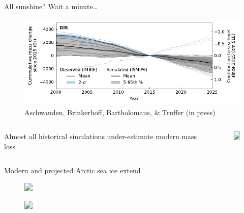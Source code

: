 \documentclass[hide notes,intlimits]{beamer}
\begin{document}
\begin{frame}{All sunshine? Wait a minute\ldots}
  \begin{figure}
    \includegraphics[width=\textwidth]{GIS_hist_with_obs}
    \caption{Aschwanden, Brinkerhoff, Bartholomaus, \& Truffer (in press)}
  \end{figure}
  \begin{columns}[c]
    \begin{column}{.5\textwidth}
      \begin{minipage}[t][.5\textheight][t]{\textwidth}
        \alert{Almost all historical simulations under-estimate modern mass loss}
      \end{minipage}
    \end{column}
    \begin{column}{.25\textwidth}
      \begin{minipage}[t][.5\textheight][t]{\textwidth}
        \begin{figure}
          \includegraphics<2>[width=1.8cm]{brain_thinking}
        \end{figure}
      \end{minipage}
    \end{column}
  \end{columns}
\end{frame}


\begin{frame}{Modern and projected Arctic sea ice extend}
  \begin{minipage}[t][1.25cm][t]{\textwidth}
    \begin{figure}
      \includegraphics<1->[width=1cm]{brain_solution}
    \end{figure}
  \end{minipage}
  \vspace{0.25em}
  \begin{minipage}[t][6.25cm][b]{\textwidth}
    \begin{figure}
          \includegraphics<2>[height=6cm]{grl23061-fig-0001}
    \end{figure}
  \end{minipage}
\end{frame}
\end{document}
